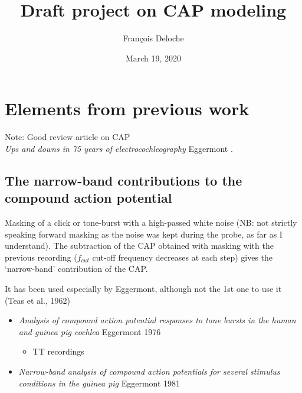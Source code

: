 \documentclass[]{article}
\title{Draft project on CAP modeling}
\author{François Deloche}
\date{March 19, 2020}
\providecommand{\tightlist}{%
  \setlength{\itemsep}{0pt}\setlength{\parskip}{0pt}}
\begin{document}
\maketitle

\hypertarget{elements-from-previous-work}{%
\section{Elements from previous
work}\label{elements-from-previous-work}}

Note: Good review article on CAP\\
\emph{Ups and downs in 75 years of electrocochleography} Eggermont
\citep{Eggermont2017}.

\hypertarget{the-narrow-band-contributions-to-the-compound-action-potential}{%
\subsection{The narrow-band contributions to the compound action
potential}\label{the-narrow-band-contributions-to-the-compound-action-potential}}

Masking of a click or tone-burst with a high-passed white noise (NB: not
strictly speaking forward masking as the noise was kept during the
probe, as far as I understand). The subtraction of the CAP obtained with
masking with the previous recording (\(f_{cut}\) cut-off frequency
decreases at each step) gives the `narrow-band' contribution of the CAP.

It has been used especially by Eggermont, although not the 1st one to
use it (Teas et al., 1962)

\begin{itemize}
\tightlist
\item
  \emph{Analysis of compound action potential responses to tone bursts
  in the human and guinea pig cochlea} Eggermont 1976
  \citep{Eggermont1976}

  \begin{itemize}
  \tightlist
  \item
    TT recordings
  \end{itemize}
\item
  \emph{Narrow-band analysis of compound action potentials for several
  stimulus conditions in the guinea pig} Eggermont 1981
\end{itemize}
\end{document}
